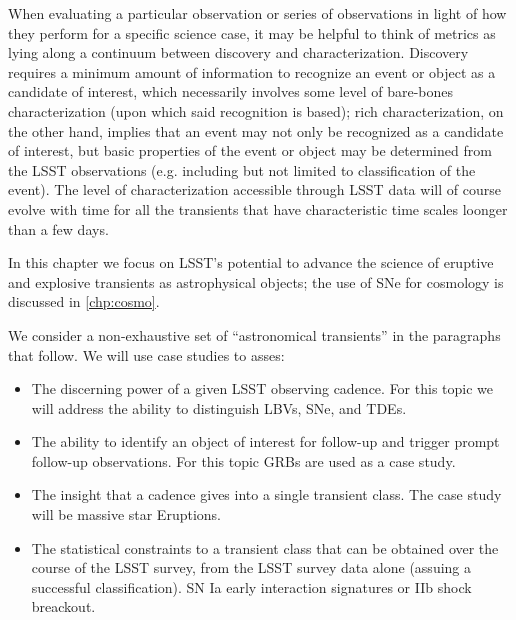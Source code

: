 When evaluating a particular observation or series of observations in light of how they perform for a specific science case, it may be helpful to think of metrics as lying along a continuum between discovery and characterization. Discovery requires a minimum amount of information to recognize an event or object as a candidate of interest, which necessarily involves some level of bare-bones characterization (upon which said recognition is based); rich characterization, on the other hand, implies that an event may not only be recognized as a candidate of interest, but basic properties of the event or object may be determined from the LSST observations (e.g. including but not limited to classification of the event). The level of characterization accessible through LSST data will of course evolve with time for all the transients that have characteristic time scales loonger than a few days. 

In this chapter we focus on LSST's potential to advance the science of eruptive and explosive transients as astrophysical objects; the use of SNe for cosmology is discussed in \autoref{chp:cosmo}.

We consider a non-exhaustive set of ``astronomical transients'' in the paragraphs that follow. We will use case studies to asses: 

\begin{itemize}
\item
The discerning power of a given LSST observing cadence. For this topic we will address the ability to distinguish LBVs, SNe, and TDEs.
\item
The ability to identify an object of interest for follow-up and trigger prompt follow-up observations. For this topic GRBs are used as a case study.
\item
The insight that a cadence gives into a single transient class. The case study will be massive star Eruptions.
\item 
The statistical constraints to a transient class that can be obtained over the course of the LSST survey, from the LSST survey data alone (assuing a successful classification). SN Ia early interaction signatures or IIb shock breackout.
\end{itemize}


